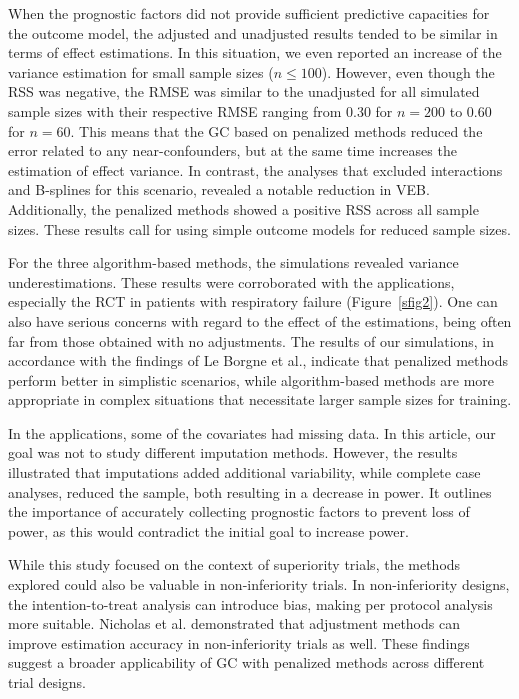 \documentclass{article}
\begin{document}
When the prognostic factors did not provide sufficient predictive capacities for the outcome model, the adjusted and unadjusted results tended to be similar in terms of effect estimations. In this situation, we even reported an increase of the variance estimation for small sample sizes ($n\leq 100$). However, even though the RSS was negative, the RMSE was similar to the unadjusted for all simulated sample sizes with their respective RMSE ranging from 0.30 for $n=200$ to 0.60 for $n=60$. This means that the GC based on penalized methods reduced the error related to any near-confounders, but at the same time increases the estimation of effect variance. 
In contrast, the analyses that excluded interactions and B-splines for this scenario, revealed a notable reduction in VEB. Additionally, the penalized methods showed a positive RSS across all sample sizes. These results call for using simple outcome models for reduced sample sizes.


For the three algorithm-based methods, the simulations revealed variance underestimations. These results were corroborated with the applications, especially the RCT in patients with respiratory failure (Figure~\ref{sfig2}). One can also have serious concerns with regard to the effect of the estimations, being often far from those obtained with no adjustments.
The results of our simulations, in accordance with the findings of Le Borgne et al.\cite{le_borgne_g-computation_2021}, indicate that penalized methods perform better in simplistic scenarios, while algorithm-based methods are more appropriate in complex situations that necessitate larger sample sizes for training. \cite{van_der_ploeg_modern_2014}

In the applications, some of the covariates had missing data. In this article, our goal was not to study different imputation methods. However, the results illustrated that imputations added additional variability, while complete case analyses, reduced the sample, both resulting in a decrease in power.
It outlines the importance of accurately collecting prognostic factors to prevent loss of power, as this would contradict the initial goal to increase power.


While this study focused on the context of superiority trials, the methods explored could also be valuable in non-inferiority trials. In non-inferiority designs, the intention-to-treat analysis can introduce bias, making per protocol analysis more suitable. \cite{schumi_through_2011} Nicholas et al. demonstrated that adjustment methods can improve estimation accuracy in non-inferiority trials as well.\cite{nicholas_impact_2015} These findings suggest a broader applicability of GC with penalized methods across different trial designs.
\end{document}
